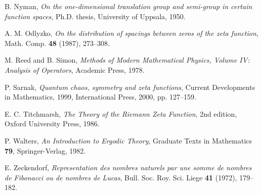 \documentclass[12pt]{article}
\theoremstyle{plain}
\theoremstyle{definition}
\begin{document}
\begin{thebibliography}{99}
B. Nyman, \textit{On the one-dimensional translation group and semi-group in certain function spaces}, Ph.D. thesis, University of Uppsala, 1950.

A. M. Odlyzko, \textit{On the distribution of spacings between zeros of the zeta function}, Math. Comp. \textbf{48} (1987), 273--308.

M. Reed and B. Simon, \textit{Methods of Modern Mathematical Physics, Volume IV: Analysis of Operators}, Academic Press, 1978.

P. Sarnak, \textit{Quantum chaos, symmetry and zeta functions}, Current Developments in Mathematics, 1999, International Press, 2000, pp. 127--159.

E. C. Titchmarsh, \textit{The Theory of the Riemann Zeta Function}, 2nd edition, Oxford University Press, 1986.

P. Walters, \textit{An Introduction to Ergodic Theory}, Graduate Texts in Mathematics \textbf{79}, Springer-Verlag, 1982.

E. Zeckendorf, \textit{Representation des nombres naturels par une somme de nombres de Fibonacci ou de nombres de Lucas}, Bull. Soc. Roy. Sci. Liege \textbf{41} (1972), 179--182.

\end{thebibliography}
\end{document}

